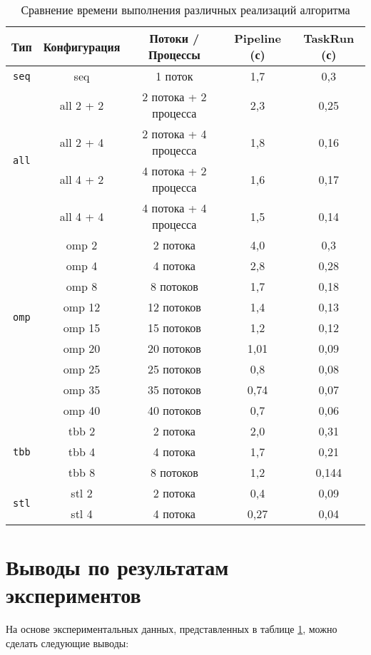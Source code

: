 \documentclass[a4paper,12pt]{article}
\begin{document}
\begin{itemize}
\begin{table}[H]
\centering
\renewcommand{\arraystretch}{1.2}
\begin{tabular}{|c|c|c|c|c|}
\hline
\textbf{Тип} & \textbf{Конфигурация} & \textbf{Потоки / Процессы} & \textbf{Pipeline (с)} & \textbf{TaskRun (с)} \\
\hline
\multirow{1}{*}{\texttt{seq}} & seq & 1 поток & 1,7 & 0,3 \\
\hline
\multirow{4}{*}{\texttt{all}} 
& all 2 + 2 & 2 потока + 2 процесса & 2,3 & 0,25 \\
& all 2 + 4 & 2 потока + 4 процесса & 1,8 & 0,16 \\
& all 4 + 2 & 4 потока + 2 процесса & 1,6 & 0,17 \\
& all 4 + 4 & 4 потока + 4 процесса & 1,5 & 0,14 \\
\hline
\multirow{8}{*}{\texttt{omp}} 
& omp 2  & 2 потока  & 4,0  & 0,3 \\
& omp 4  & 4 потока  & 2,8  & 0,28 \\
& omp 8  & 8 потоков & 1,7  & 0,18 \\
& omp 12 & 12 потоков & 1,4  & 0,13 \\
& omp 15 & 15 потоков & 1,2  & 0,12 \\
& omp 20 & 20 потоков & 1,01 & 0,09 \\
& omp 25 & 25 потоков & 0,8  & 0,08 \\
& omp 35 & 35 потоков & 0,74 & 0,07 \\
& omp 40 & 40 потоков & 0,7  & 0,06 \\
\hline
\multirow{3}{*}{\texttt{tbb}} 
& tbb 2 & 2 потока & 2,0 & 0,31 \\
& tbb 4 & 4 потока & 1,7 & 0,21 \\
& tbb 8 & 8 потоков & 1,2 & 0,144 \\
\hline
\multirow{2}{*}{\texttt{stl}} 
& stl 2 & 2 потока & 0,4 & 0,09 \\
& stl 4 & 4 потока & 0,27 & 0,04 \\
\hline
\end{tabular}
\caption{Сравнение времени выполнения различных реализаций алгоритма}
\label{tab:results}
\end{table}
\newpage
\section{Выводы по результатам экспериментов}

На основе экспериментальных данных, представленных в таблице \ref{tab:results}, можно сделать следующие выводы:


\end{itemize}
\end{document}

